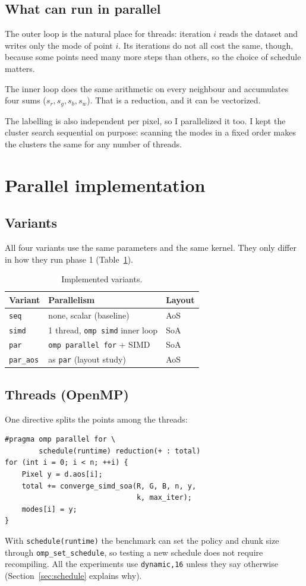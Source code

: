 \documentclass[10pt,twocolumn,letterpaper]{article}
\begin{document}
\subsection{What can run in parallel}
The outer loop is the natural place for threads: iteration $i$ reads the dataset and writes only
the mode of point $i$. Its iterations do not all cost the same, though, because some points need
many more steps than others, so the choice of schedule matters.

The inner loop does the same arithmetic on every neighbour and accumulates four sums ($s_r, s_g,
s_b, s_w$). That is a reduction, and it can be vectorized.

The labelling is also independent per pixel, so I parallelized it too. I kept the cluster search
sequential on purpose: scanning the modes in a fixed order makes the clusters the same for any
number of threads.

\section{Parallel implementation}

\subsection{Variants}
All four variants use the same parameters and the same kernel. They only differ in how they run
phase 1 (Table~\ref{tab:variants}).

\begin{table}[h]
\centering
\small
\begin{tabular}{@{}lll@{}}
\toprule
\textbf{Variant} & \textbf{Parallelism} & \textbf{Layout} \\ \midrule
\texttt{seq}     & none, scalar (baseline)           & AoS \\
\texttt{simd}    & 1 thread, \texttt{omp simd} inner loop & SoA \\
\texttt{par}     & \texttt{omp parallel for} + SIMD  & SoA \\
\texttt{par\_aos} & as \texttt{par} (layout study)   & AoS \\ \bottomrule
\end{tabular}
\caption{Implemented variants.}
\label{tab:variants}
\end{table}

\subsection{Threads (OpenMP)}
One directive splits the points among the threads:
\begin{lstlisting}
#pragma omp parallel for \
        schedule(runtime) reduction(+ : total)
for (int i = 0; i < n; ++i) {
    Pixel y = d.aos[i];
    total += converge_simd_soa(R, G, B, n, y,
                               k, max_iter);
    modes[i] = y;
}
\end{lstlisting}
With \texttt{schedule(runtime)} the benchmark can set the policy and chunk size through
\texttt{omp\_set\_schedule}, so testing a new schedule does not require recompiling. All the
experiments use \texttt{dynamic,16} unless they say otherwise (Section~\ref{sec:schedule} explains
why).
\end{document}
